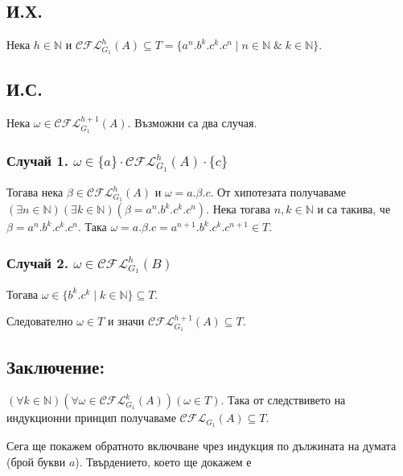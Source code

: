 \documentclass[12pt]{article}
\begin{document}
\subsection*{И.Х.}
Нека \(h \in \mathbb{N}\) и \(\mathcal{CFL}_{G_1}^h(A) \subseteq T = \{a^n.b^k.c^k.c^n \mid n \in \mathbb{N} \;\&\; k \in \mathbb{N}\}\).

\subsection*{И.С.}
Нека \(\omega \in \mathcal{CFL}_{G_1}^{h + 1}(A)\). Възможни са два случая.

\subsubsection*{Случай 1. \(\omega \in \{a\} \cdot \mathcal{CFL}_{G_1}^h(A) \cdot \{c\}\)}
Тогава нека \(\beta \in \mathcal{CFL}_{G_1}^h(A)\) и \(\omega = a.\beta.c\).
От хипотезата получаваме \((\exists n \in \mathbb{N})(\exists k \in \mathbb{N})(\beta = a^n.b^k.c^k.c^n)\).
Нека тогава \(n, k \in \mathbb{N}\) и са такива, че \(\beta = a^n.b^k.c^k.c^n\).
Така \(\omega = a.\beta.c = a^{n + 1}.b^k.c^k.c^{n + 1} \in T\).


\subsubsection*{Случай 2. \(\omega \in \mathcal{CFL}_{G_1}^h(B)\)}
Тогава \(\omega \in \{b^k.c^k \mid k \in \mathbb{N}\} \subseteq T\).

\vspace*{5mm}

\par Следователно \(\omega \in T\) и значи \(\mathcal{CFL}_{G_1}^{h + 1}(A) \subseteq T\).

\subsection*{Заключение:}
\((\forall k \in \mathbb N)(\forall \omega \in \mathcal{CFL}_{G_1}^k(A))(\omega \in T )\).
Така от следствивето на индукционни принцип получаваме \(\mathcal{CFL}_{G_1}(A) \subseteq T\).

\vspace*{5mm}

\par Сега ще покажем обратното включване чрез индукция по дължината на думата (брой букви \(a\)).
Твърдението, което ще докажем е 
\end{document}
